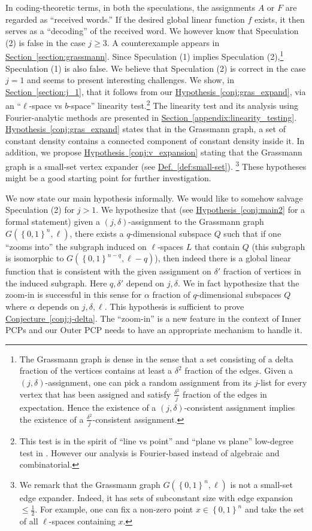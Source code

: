 \documentclass[11pt]{article}
\numberwithin{equation}{section}
\theoremstyle{definition}
\theoremstyle{plain}
\newcommand{\expref}[2]{\hyperref[#2]{#1~\ref{#2}}}
\newcommand\set[1]{{\left\{ #1 \right\}}}
\newcommand\power[1]{\set{0,1}^{#1}}
\renewcommand\geq{\geqslant}
\renewcommand\leq{\leqslant}
\begin{document}
\medskip In coding-theoretic terms,
in both the speculations, the assignments $A$ or $F$ are regarded as ``received words.''
If the desired global linear function $f$ exists, it then serves as a ``decoding'' of the received word.
We however know that Speculation (2) is false in the case $j \geq 3$. A counterexample appears in \expref{Section}{section:grassmann}. Since
Speculation (1) implies Speculation (2),\footnote{The Grassmann graph is
dense in the sense that a set %
%
consisting of a delta fraction of the vertices %
contains at least
a   %
$\delta^2$ fraction of the edges. Given a $(j,\delta)$-assignment,
one can pick a random assignment from its $j$-list for every vertex that has been assigned
and satisfy $\frac{\delta^2}{j}$ fraction of the edges in
expectation. Hence
the %
existence of
a $(j,\delta)$-consistent assignment implies
the %
existence of a $\frac{\delta^2}{j}$-consistent assignment.} Speculation (1) is also false.
We believe that Speculation (2) is correct in the case $j=1$ and
seems to present interesting challenges. We show, in \expref{Section}{section:j_1}, that
 it follows from our \expref{Hypothesis}{conj:gras_expand}, via
%
an  %
 ``$\ell$-space vs $b$-space''
linearity test.\footnote{This test is in the spirit of ``line vs point'' and
``plane vs plane'' low-degree test in \cite{RS96,AS98,RS97}.
 However our analysis is Fourier-based instead of algebraic and combinatorial.}
The linearity test and its analysis using Fourier-analytic methods are presented in \expref{Section}{appendix:linearity_testing}.
\expref{Hypothesis}{conj:gras_expand} states that in the Grassmann graph, a set of
constant density contains a connected component of constant density inside it.
In addition, we propose \expref{Hypothesis}{conj:v_expansion} stating
that the Grassmann graph is a small-set vertex expander
(see \expref{Def.}{def:small-set}).%
%
\footnote{We remark that the Grassmann graph $G(\power{n},\ell)$
is not a small-set edge expander.
Indeed, it has sets of subconstant size with edge expansion $\leq \frac{1}{2}$.
For example, one can fix a non-zero point $x \in \power{n}$ and take
the set of all $\ell$-spaces containing $x$.}
These hypotheses might be a good starting point for further investigation.

We now state our main hypothesis informally. We would like to somehow salvage Speculation (2) for $j>1$. We hypothesize that (see \expref{Hypothesis}{conj:main2} for a formal statement)
given a $(j,\delta)$-assignment to the Grassmann graph $G(\power{n}, \ell)$, there exists a $q$-dimensional subspace $Q$ such that if one
``zooms into'' the subgraph induced on $\ell$-spaces $L$ that contain $Q$ (this subgraph is isomorphic to $G(\power{n-q}, \ell-q)$), then indeed
there is a global linear function that is consistent with the given assignment on $\delta'$ fraction of vertices in the induced subgraph.
Here $q, \delta'$ depend on $j,\delta$. We in fact hypothesize that the zoom-in is successful in this sense for $\alpha$ fraction of $q$-dimensional
subspaces $Q$ where $\alpha$ depends on $j,\delta, \ell$. This hypothesis is sufficient to prove \expref{Conjecture}{conj:j-delta}.
The ``zoom-in'' is a new feature in the context of Inner PCPs and our
Outer PCP needs to have an appropriate mechanism to handle it.
\end{document}
